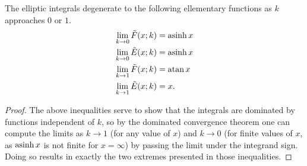 \begin{lem} \label{lem:klimit}
The elliptic integrals degenerate to the following ellementary functions as $k$ approaches $0$ or $1$.
\begin{align*}
    \lim_{k\to 0} \tilde{F}(x; k) &= \operatorname{asinh} {x} \\
    \lim_{k\to 0} \tilde{E}(x; k) &= \operatorname{asinh} {x} \\
    \lim_{k\to 1} \tilde{F}(x; k) &= \operatorname{atan} {x} \\
    \lim_{k\to 1} \tilde{E}(x; k) &= x.
\end{align*}
\begin{proof}
The above inequalities serve to show that the integrals are dominated by functions independent of $k$, so by the dominated convergence theorem one can compute the limits as $k \to 1$ (for any value of $x$) and $k \to 0$ (for finite values of $x$, as $\operatorname{asinh} x$ is not finite for $x=\infty$) by passing the limit under the integrand sign. Doing so results in exactly the two extremes presented in those inequalities.
\end{proof}
\end{lem}














